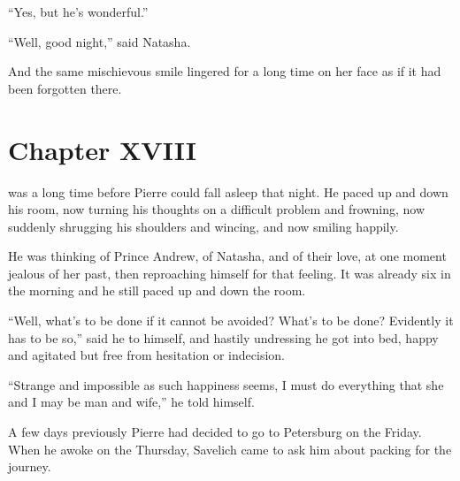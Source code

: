 ``Yes, but he's wonderful.''

``Well, good night,'' said Natasha.

And the same mischievous smile lingered for a long time on her
face as if it had been forgotten there.


\chapter*{Chapter XVIII}
\ifaudio 
{}
\fi

 was a long time before Pierre could fall asleep that night. He
paced up and down his room, now turning his thoughts on a
difficult problem and frowning, now suddenly shrugging his
shoulders and wincing, and now smiling happily.

He was thinking of Prince Andrew, of Natasha, and of their love,
at one moment jealous of her past, then reproaching himself for
that feeling.  It was already six in the morning and he still
paced up and down the room.

``Well, what's to be done if it cannot be avoided? What's to be
done?  Evidently it has to be so,'' said he to himself, and
hastily undressing he got into bed, happy and agitated but free
from hesitation or indecision.

``Strange and impossible as such happiness seems, I must do
everything that she and I may be man and wife,'' he told himself.

A few days previously Pierre had decided to go to Petersburg on
the Friday. When he awoke on the Thursday, Savelich came to ask
him about packing for the journey.


